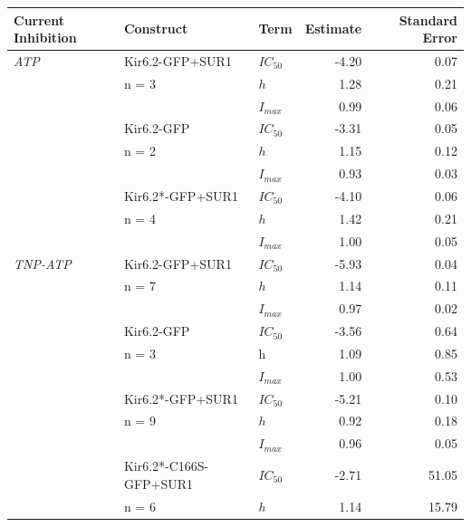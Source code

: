 \documentclass[9pt,lineno, onehalfspacing]{elife_modified}
\begin{document}
\begin{table}
\centering\begingroup
\begin{tabular}{l l l r r}
\toprule
\textbf{Current Inhibition} & Construct & Term & Estimate & Standard Error\\
\midrule
\textit{ATP} & Kir6.2-GFP+SUR1            & $IC_{50}$ & -4.20 & 0.07\\
             & n = 3                      & $h$       & 1.28  & 0.21\\
             &                            & $I_{max}$ & 0.99  & 0.06\\
\cmidrule{2-5}
             & Kir6.2-GFP                 & $IC_{50}$ & -3.31 & 0.05\\
             & n = 2                      & $h$       & 1.15  & 0.12\\
             &                            & $I_{max}$ & 0.93  & 0.03\\
\cmidrule{2-5}
             & Kir6.2*-GFP+SUR1           & $IC_{50}$ & -4.10 & 0.06\\
             & n = 4                      & $h$       & 1.42  & 0.21\\
             &                            & $I_{max}$ & 1.00  & 0.05\\
\cmidrule{2-5}
\textit{TNP-ATP} & Kir6.2-GFP+SUR1        & $IC_{50}$ & -5.93 & 0.04\\
                 & n = 7                  & $h$       & 1.14  & 0.11\\
                 &                        & $I_{max}$ & 0.97  & 0.02\\
\cmidrule{2-5}
                 & Kir6.2-GFP             & $IC_{50}$ & -3.56 & 0.64\\
                 & n = 3                  & h         & 1.09  & 0.85\\
                 &                        & $I_{max}$ & 1.00  & 0.53\\
\cmidrule{2-5}
                 & Kir6.2*-GFP+SUR1       & $IC_{50}$ & -5.21 & 0.10\\
                 & n = 9                  & $h$       & 0.92  & 0.18\\
                 &                        & $I_{max}$ & 0.96  & 0.05\\
\cmidrule{2-5}
                 & Kir6.2*-C166S-GFP+SUR1 & $IC_{50}$ & -2.71 & 51.05\\
                 & n = 6                  & $h$       & 1.14  & 15.79\\

\end{tabular}
\end{table}
\end{document}
